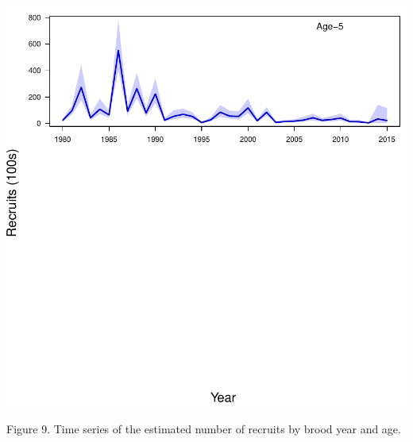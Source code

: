 \documentclass[11pt,]{article}
\begin{document}
\includegraphics{App_3_Summarize_results_files/figure-latex/plot_recruits_by_age-2.pdf}

Figure 9. Time series of the estimated number of recruits by brood year
and age.
\end{document}
